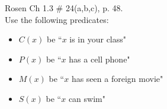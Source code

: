 \documentclass[12pt]{exam}
\newenvironment{my_parts}{
\begin{parts}
    \setlength{\itemsep}{1pt}
    \setlength{\parskip}{0pt}
    \setlength{\parsep}{0pt}
}{\end{parts}}
\begin{document}
\begin{questions}
\printanswers


\question[6] Rosen Ch 1.3 \# 24(a,b,c), p. 48. \\
Use the following predicates:
\begin{itemize}
    \item $C(x)$ be ``$x$ is in your class"
    \item $P(x)$ be ``$x$ has a cell phone"
    \item $M(x)$ be ``$x$ has seen a foreign movie"
    \item $S(x)$ be ``$x$ can swim"
\end{itemize}
    \begin{solution}
    \end{solution}



\end{questions}
\end{document}
